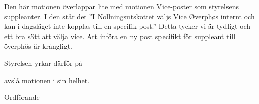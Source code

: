 \documentclass[../_main/handlingar.tex]{subfiles}
\begin{document}
\motionssvar
Den här motionen överlappar lite med motionen Vice-poster som styrelsens suppleanter. I den står det ”I Nollningsutskottet väljs Vice Øverphøs internt och kan i dagsläget inte kopplas
till en specifik post.” Detta tycker vi är tydligt och ett bra sätt att välja vice. Att införa en ny post specifikt för suppleant till överphös är krångligt.

Styrelsen yrkar därför på

\begin{attsatser}
    \att avslå motionen i sin helhet.
\end{attsatser}


\begin{signatures}{1}
	\ist
	\signature{Daniel Bakic}{Ordförande}
\end{signatures}
\end{document}
